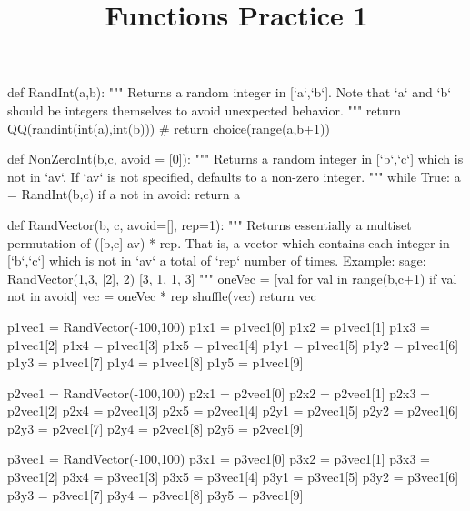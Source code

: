 \documentclass{ximera}
\title{Functions Practice 1}
\begin{document}
%
\begin{sagesilent}
def RandInt(a,b):
    """ Returns a random integer in [`a`,`b`]. Note that `a` and `b` should be integers themselves to avoid unexpected behavior.
    """
    return QQ(randint(int(a),int(b)))
    # return choice(range(a,b+1))

def NonZeroInt(b,c, avoid = [0]):
    """ Returns a random integer in [`b`,`c`] which is not in `av`. 
        If `av` is not specified, defaults to a non-zero integer.
    """
    while True:
        a = RandInt(b,c)
        if a not in avoid:
            return a

def RandVector(b, c, avoid=[], rep=1):
    """ Returns essentially a multiset permutation of ([b,c]-av) * rep.
        That is, a vector which contains each integer in [`b`,`c`] which is not in `av` a total of `rep` number of times.
        Example:
        sage: RandVector(1,3, [2], 2)
        [3, 1, 1, 3]
    """
    oneVec = [val for val in range(b,c+1) if val not in avoid]
    vec = oneVec * rep
    shuffle(vec)
    return vec

p1vec1 = RandVector(-100,100)
p1x1 = p1vec1[0]
p1x2 = p1vec1[1]
p1x3 = p1vec1[2]
p1x4 = p1vec1[3]
p1x5 = p1vec1[4]
p1y1 = p1vec1[5]
p1y2 = p1vec1[6]
p1y3 = p1vec1[7]
p1y4 = p1vec1[8]
p1y5 = p1vec1[9]

p2vec1 = RandVector(-100,100)
p2x1 = p2vec1[0]
p2x2 = p2vec1[1]
p2x3 = p2vec1[2]
p2x4 = p2vec1[3]
p2x5 = p2vec1[4]
p2y1 = p2vec1[5]
p2y2 = p2vec1[6]
p2y3 = p2vec1[7]
p2y4 = p2vec1[8]
p2y5 = p2vec1[9]

p3vec1 = RandVector(-100,100)
p3x1 = p3vec1[0]
p3x2 = p3vec1[1]
p3x3 = p3vec1[2]
p3x4 = p3vec1[3]
p3x5 = p3vec1[4]
p3y1 = p3vec1[5]
p3y2 = p3vec1[6]
p3y3 = p3vec1[7]
p3y4 = p3vec1[8]
p3y5 = p3vec1[9]

\end{sagesilent}
\end{document}
